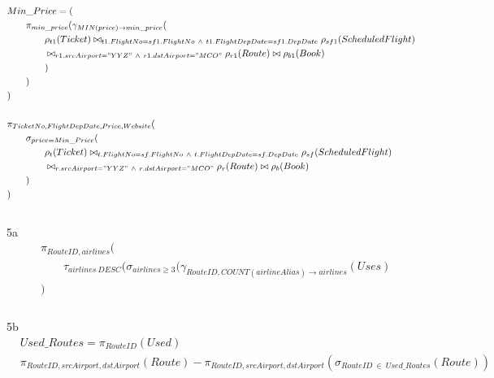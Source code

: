 \documentclass[fleqn]{article}
\begin{document}
\begin{equation*}
    \begin{aligned}
    & Min\_Price = ( \\
    & \qquad \pi_{min\_price} ( \gamma_{MIN(price) \rightarrow min\_price}( \\
    & \qquad \qquad \rho_{t1}(Ticket) \bowtie_{t1.FlightNo = sf1.FlightNo \ \land \ t1.FlightDepDate = sf1.DepDate} \rho_{sf1}(ScheduledFlight) \\
    & \qquad \qquad \bowtie_{r1.srcAirport = "YYZ" \ \land \ r1.dstAirport = "MCO"} \rho_{r1}(Route) \bowtie \rho_{b1}(Book) \\
    & \qquad \qquad ) \\
    & \qquad ) \\
    & ) \\
    &\ \\
    & \pi_{TicketNo, FlightDepDate, Price, Website} ( \\
    & \qquad \sigma_{price = Min\_Price} ( \\
    & \qquad \qquad \rho_{t}(Ticket) \bowtie_{t.FlightNo = sf.FlightNo \ \land \ t.FlightDepDate = sf.DepDate} \rho_{sf}(ScheduledFlight) \\
    & \qquad \qquad \bowtie_{r.srcAirport = "YYZ" \ \land \ r.dstAirport = "MCO"} \rho_{r}(Route) \bowtie \rho_{b}(Book) \\
    & \qquad ) \\
    & ) \\
    \end{aligned}
\end{equation*} \\

\noindent 5a \\
\begin{equation*}
    \begin{aligned}
    & \pi_{RouteID, airlines} ( \\
    & \qquad \tau_{airlines\ DESC}( \sigma_{airlines \geq 3}( \gamma_{RouteID, COUNT(airlineAlias) \rightarrow airlines}(Uses) \\
    & ) \\
    \end{aligned}
\end{equation*} \\

\noindent 5b \\
\begin{equation*}
    \begin{aligned}
    & Used\_Routes = \pi_{RouteID} (Used) \\
    & \pi_{RouteID, srcAirport, dstAirport} (Route) - \pi_{RouteID, srcAirport, dstAirport} (\sigma_{RouteID \ \in \ Used\_Routes}(Route)) \\
    \end{aligned}
\end{equation*}
\end{document}
